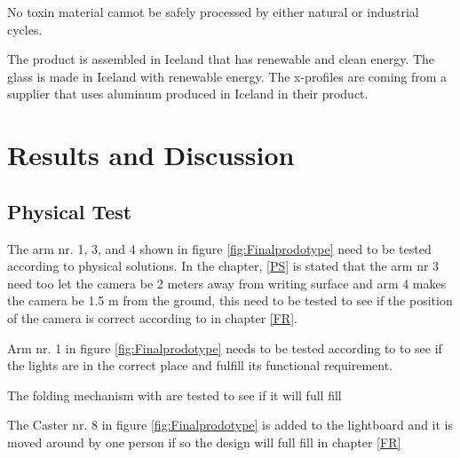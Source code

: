 \documentclass[a4paper]{jpconf}
\begin{document}
No toxin material cannot be safely processed by either natural or industrial cycles.

The product is assembled in Iceland that has renewable and clean energy.
The glass is made in Iceland with renewable energy.
The x-profiles are coming from a supplier that uses aluminum produced in Iceland in their product. 


\section{Results and Discussion}
\subsection{Physical Test}
The arm nr. 1, 3, and 4  shown in figure \ref{fig:Finalprodotype} need to be tested according to physical solutions. In the chapter, \ref{PS} is stated that the arm nr 3 need too let the camera be 2 meters away from writing surface and arm 4 makes the camera be 1.5 m from the ground, this need to be tested to see if the position of the camera is correct according to  in chapter \ref{FR}.

Arm nr. 1  in figure \ref{fig:Finalprodotype} needs to be tested according to  to see if the lights are in the correct place and fulfill its functional requirement. 

The folding mechanism  with  are tested to see if it will full fill 


The Caster nr. 8  in figure \ref{fig:Finalprodotype} is added to the lightboard and it is moved around by one person if so the design will full fill  in chapter \ref{FR}
\end{document}
